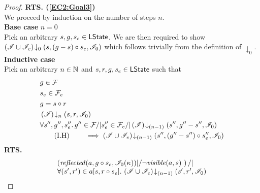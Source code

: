 \begin{lemma}
\begin{proof}
\noindent\textbf{RTS. (\ref{EC2:Goal3})} \\
We proceed by induction on the number of steps $n$.\\

\noindent\textbf{Base case }$n=0$\\
Pick an arbitrary $s, g, s_e \in \textsf{LState}$. We are then required to show	$\left(\mathscr{I} \cup \mathscr{I}_e\right) \!\downarrow_{0} \left(s, (g-s) \circ s_e, \mathscr{I}_0\right)$ which follows trivially from the definition of $\downarrow_0$.\\


\noindent\textbf{Inductive case }\\
Pick an arbitrary $n \in \mathbb{N}$ and $s, r, g, s_e \in \textsf{LState}$ such that
%
\begin{align}
	& g \in \mathcal{F}_{} \label{LEC2:Ass1}\\
	& s_e \in \mathcal{F}_{e} \label{LEC2:Ass2}\\
	& g = s \circ r \label{LEC2:Ass3} \\
	& \left(\mathscr{I}\right) \!\downarrow_{n} \left(s, r, \mathscr{I}_0\right) \label{LEC2:Ass4}\\
	& \forall s'', g'', s_e''.\,  g'' \in \mathcal{F}_{} /| s''_e \in \mathcal{F}_{e} /| \left(\mathscr{I}\right) \!\downarrow_{(n-1)} \left(s'', g''-s'', \mathscr{I}_0\right) \nonumber \\
	& \tag{I.H} \qquad \implies \left(\mathscr{I} \cup \mathscr{I}_{e}\right) \!\downarrow_{(n-1)} \left(s'', (g''-s'') \circ s_e'', \mathscr{I}_{0}\right) \label{LEC2:IH}
\end{align}
%
\textbf{RTS.}
%
\begin{align*}
%  
	& \quad
  \begin{array}{@{} l @{}}
		\left(\m{reflected}(a,g \composeL s_e, \lmod_0(\ca{})) |/ \neg\m{visible}(a, s) \ \right) /| \\
		\for{(s', r') \in a[s, r \composeL s_e]} \extendsAMUpto{\lmod \cup \lmod_e}{(n-1)}{s'}{r'}{\lmod_0}
 	\end{array} 
\end{align*}
%
%


\end{proof}
\end{lemma}
